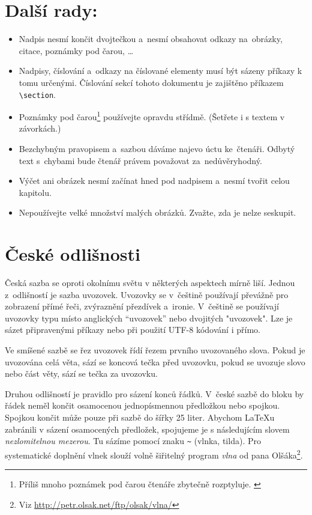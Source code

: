 \documentclass[10pt, a4paper, twocolumn]{article}
\begin{document}
\section{Další rady:}
\label{trojka}
\begin{itemize}
\item Nadpis nesmí končit dvojtečkou a~nesmí obsahovat odkazy na~obrázky, citace, poznámky pod čarou, \ldots

\item Nadpisy, číslování a~odkazy na číslované elementy musí být sázeny příkazy k tomu určenými.
Číslování sekcí tohoto dokumentu je zajištěno příkazem \verb|\section|.

\item Poznámky pod čarou\footnote{Příliš mnoho poznámek pod čarou čtenáře zbytečně rozptyluje. \label{footnote1}} používejte opravdu střídmě.
(Šetřete i s textem v závorkách.)

\item Bezchybným pravopisem a~sazbou dáváme najevo úctu ke~čtenáři.
Odbytý text s~chybami bude čtenář právem považovat za~nedůvěryhodný.

\item Výčet ani obrázek nesmí začínat hned pod nadpisem a~nesmí tvořit celou kapitolu.

\item Nepoužívejte velké množství malých obrázků.
Zvažte, zda je nelze seskupit.
\end{itemize}
\section{České odlišnosti}
\label{ctverka}
Česká sazba se oproti okolnímu světu v některých aspektech mírně liší.
Jednou z~odlišností je sazba uvozovek.
Uvozovky se v~češtině používají převážně pro zobrazení přímé řeči, zvýraznění přezdívek a~ironie.
V~češtině se používají uvozovky typu  místo anglických ``uvozovek'' nebo dvojitých "uvozovek".
Lze je sázet připravenými příkazy nebo při použití UTF-8 kódování i přímo.

Ve smíšené sazbě se řez uvozovek řídí řezem prvního uvozovaného slova.
Pokud je uvozována celá věta, sází se koncová tečka před uvozovku, pokud se uvozuje slovo nebo část věty, sází se tečka za uvozovku.

Druhou odlišností je pravidlo pro sázení konců řádků.
V~české sazbě do bloku by řádek neměl končit osamocenou jednopísmennou předložkou nebo spojkou.
Spojkou  končit může pouze při sazbě do šířky 25 liter.
Abychom \LaTeX u zabránili v sázení osamocených předložek, spojujeme je s následujícím slovem \textit{nezlomitelnou mezerou}.
Tu sázíme pomocí znaku \verb|~| (vlnka, tilda).
Pro systematické doplnění vlnek slouží volně šiřitelný program \textit{vlna} od pana Olšáka\footnote{Viz \ttfamily
\href{http://petr.olsak.net/ftp/olsak/vlna/}{http://petr.olsak.net/ftp/olsak/vlna/}}.
\end{document}
